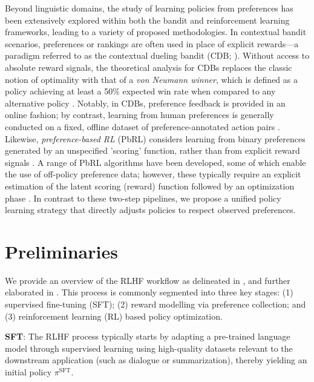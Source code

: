 Beyond linguistic domains, the study of learning policies from preferences has been extensively explored within both the bandit and reinforcement learning frameworks, leading to a variety of proposed methodologies. In contextual bandit scenarios, preferences or rankings are often used in place of explicit rewards—a paradigm referred to as the contextual dueling bandit (CDB; \cite{yue2012karmed,dudik2015contextual}). Without access to absolute reward signals, the theoretical analysis for CDBs replaces the classic notion of optimality with that of a \textit{von Neumann winner}, which is defined as a policy achieving at least a 50\% expected win rate when compared to any alternative policy \citep{dudik2015contextual}. Notably, in CDBs, preference feedback is provided in an online fashion; by contrast, learning from human preferences is generally conducted on a fixed, offline dataset of preference-annotated action pairs \citep{yan2022human}. Likewise, \textit{preference-based RL} (PbRL) considers learning from binary preferences generated by an unspecified 'scoring' function, rather than from explicit reward signals \citep{BusaFekete2014,ruiz2023dueling}. A range of PbRL algorithms have been developed, some of which enable the use of off-policy preference data; however, these typically require an explicit estimation of the latent scoring (reward) function followed by an optimization phase \citep{jain2013learning,BusaFekete2014,christiano2017deep,sadigh2017active,kupcsik2018learning}. In contrast to these two-step pipelines, we propose a unified policy learning strategy that directly adjusts policies to respect observed preferences.

\section{Preliminaries}\label{section:prelims}

We provide an overview of the RLHF workflow as delineated in \citeauthor{ziegler2020finetuning}, and further elaborated in \citep{stiennon2022learning, bai2022training, ouyang2022training}. This process is commonly segmented into three key stages: (1) supervised fine-tuning (SFT); (2) reward modelling via preference collection; and (3) reinforcement learning (RL) based policy optimization.

\textbf{SFT}: The RLHF process typically starts by adapting a pre-trained language model through supervised learning using high-quality datasets relevant to the downstream application (such as dialogue or summarization), thereby yielding an initial policy $\pi^\text{SFT}$.

